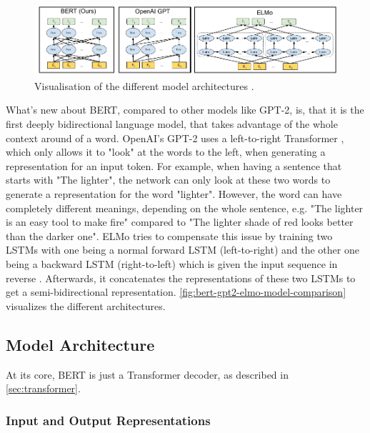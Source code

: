 \begin{figure}[h]
\centering
\includegraphics[width=0.7\paperwidth]{figures/bert-gpt2-elmo-model-comparison}
\caption[Visualisation of the different model architectures]{Visualisation of the different model architectures \cite[p.~13]{devlin2018bert}.}
\label{fig:bert-gpt2-elmo-model-comparison}
\end{figure}

What's new about BERT, compared to other models like GPT-2, is, that it is the first deeply bidirectional language model, that takes advantage of the whole context around of a word.
OpenAI's GPT-2 uses a left-to-right Transformer \cite[p.~4]{radford2019language}, which only allows it to "look" at the words to the left, when generating a representation for an input token.
For example, when having a sentence that starts with "The lighter", the network can only look at these two words to generate a representation for the word "lighter".
However, the word can have completely different meanings, depending on the whole sentence, e.g. "The lighter is an easy tool to make fire" compared to "The lighter shade of red looks better than the darker one". 
ELMo tries to compensate this issue by training two LSTMs with one being a normal forward LSTM (left-to-right) and the other one being a backward LSTM (right-to-left) which is given the input sequence in reverse \cite[p.~2--3]{1802.05365}.
Afterwards, it concatenates the representations of these two LSTMs to get a semi-bidirectional representation.
\autoref{fig:bert-gpt2-elmo-model-comparison} visualizes the different architectures.

\subsection{Model Architecture}

At its core, BERT is just a Transformer decoder, as described in \autoref{sec:transformer}.

\subsubsection{Input and Output Representations}

